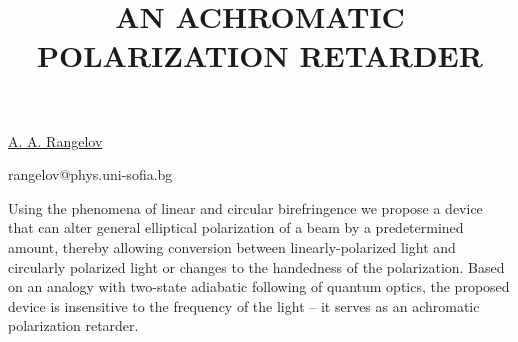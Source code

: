 \title{AN ACHROMATIC POLARIZATION RETARDER}

\underline{A. A. Rangelov}

{\normalsize{

\vspace{-4mm} \unisofia

\email rangelov@phys.uni-sofia.bg}}

Using the phenomena of linear and circular birefringence we propose a device that can alter general elliptical polarization of a beam by a predetermined amount, thereby allowing conversion between linearly-polarized light and circularly polarized light or changes to the handedness of the polarization. Based on an analogy with two-state adiabatic following of quantum optics, the proposed
device is insensitive to the frequency of the light -- it serves as an achromatic polarization retarder.

\vspace{\baselineskip}
